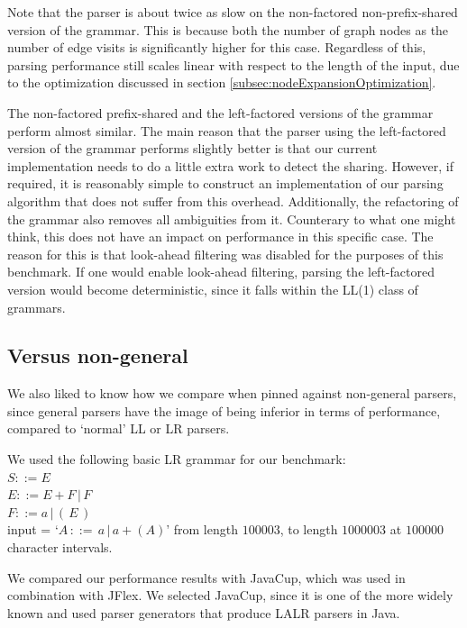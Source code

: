 \documentclass[a4paper,10pt]{article}
\begin{document}
Note that the parser is about twice as slow on the non-factored non-prefix-shared version of the grammar. This is because both the number of graph nodes as the number of edge visits is significantly higher for this case. Regardless of this, parsing performance still scales linear with respect to the length of the input, due to the optimization discussed in section \ref{subsec:nodeExpansionOptimization}.

The non-factored prefix-shared and the left-factored versions of the grammar perform almost similar. The main reason that the parser using the left-factored version of the grammar performs slightly better is that our current implementation needs to do a little extra work to detect the sharing. However, if required, it is reasonably simple to construct an implementation of our parsing algorithm that does not suffer from this overhead. Additionally, the refactoring of the grammar also removes all ambiguities from it. Counterary to what one might think, this does not have an impact on performance in this specific case. The reason for this is that look-ahead filtering was disabled for the purposes of this benchmark. If one would enable look-ahead filtering, parsing the left-factored version would become deterministic, since it falls within the LL(1) class of grammars.

\subsection{Versus non-general}

We also liked to know how we compare when pinned against non-general parsers, since general parsers have the image of being inferior in terms of performance, compared to `normal' LL or LR parsers.

We used the following basic LR grammar for our benchmark:\\
$S ::= E$\\
$E ::= E + F\,|\,F$\\
$F ::= a\,|\,(\,E\,)$\\
input = `$A\,::=\,a\,|\,a+(A)$' from length $100003$, to length $1000003$ at $100000$ character intervals.

We compared our performance results with JavaCup, which was used in combination with JFlex. We selected JavaCup, since it is one of the more widely known and used parser generators that produce LALR parsers in Java.
\end{document}
